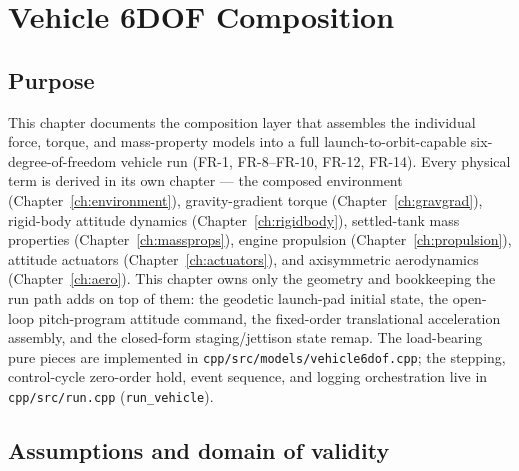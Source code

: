\chapter{Vehicle 6DOF Composition}
\label{ch:vehicle6dof}

\section{Purpose}
\label{sec:vehicle6dof:purpose}

This chapter documents the composition layer that assembles the individual
force, torque, and mass-property models into a full launch-to-orbit-capable
six-degree-of-freedom vehicle run (FR-1, FR-8--FR-10, FR-12, FR-14). Every
physical term is derived in its own chapter --- the composed environment
(Chapter~\ref{ch:environment}), gravity-gradient torque
(Chapter~\ref{ch:gravgrad}), rigid-body attitude dynamics
(Chapter~\ref{ch:rigidbody}), settled-tank mass properties
(Chapter~\ref{ch:massprops}), engine propulsion (Chapter~\ref{ch:propulsion}),
attitude actuators (Chapter~\ref{ch:actuators}), and axisymmetric aerodynamics
(Chapter~\ref{ch:aero}). This chapter owns only the geometry and bookkeeping
the run path adds on top of them: the geodetic launch-pad initial state, the
open-loop pitch-program attitude command, the fixed-order translational
acceleration assembly, and the closed-form staging/jettison state remap. The
load-bearing pure pieces are implemented in
\texttt{cpp/src/models/vehicle6dof.cpp}; the stepping, control-cycle
zero-order hold, event sequence, and logging orchestration live in
\texttt{cpp/src/run.cpp} (\texttt{run\_vehicle}).

\section{Assumptions and domain of validity}
\label{sec:vehicle6dof:domain}

